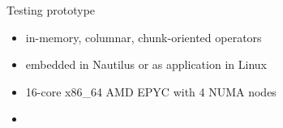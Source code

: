 \begin{block}{Testing prototype}
  \begin{itemize}
  \item in-memory, columnar, chunk-oriented operators
  \item embedded in Nautilus or as application in Linux
  \item 16-core x86\_64 AMD EPYC with 4 NUMA nodes
 \item {}
  \end{itemize}
\end{block}
